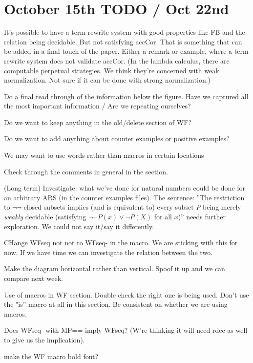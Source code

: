 \documentclass{article}
\newcommand{\cmark}{\ding{51}}%
\newcommand{\done}{\rlap{$\square$}{\raisebox{2pt}{\large\hspace{1pt}\cmark}}%
\hspace{-2.5pt}}
\begin{document}
\section*{October 15th TODO / Oct 22nd}
\begin{todolist}     
  \item It's possible to have a term rewrite system with good properties like FB and the relation being decidable. But not satisfying accCor. That is something that can be added in a final touch of the paper. Either a remark or example, where a term rewrite system does not validate accCor. (In the lambda calculus, there are computable perpetual strategies. We think they're concerned with weak normalization. Not sure if it can be done with strong normalization.)
  \item Do a final read through of the information below the figure. Have we captured all the most important information / Are we repeating ourselves?
  \item [\done] Do we want to keep anything in the old/delete section of WF?
  \item Do we want to add anything about counter examples or positive examples? 
  \item We may want to use words rather than macros in certain locations
  \item [\done] Check through the comments in general in the section. 
  \item (Long term) Investigate: what we've done for natural numbers could be done for an arbitrary ARS (in the counter examples files). The sentence: ''The restriction to $\lnot\lnot$-closed subsets implies (and is equivalent to) 
every subset $P$ being merely \emph{weakly} decidable (satisfying $\lnot \lnot P(x) \lor \lnot P(X)$ 
for all $x$)'' needs further exploration. We could not say it/say it differently. 
\item [\done]  CHange WFseq not not to WFseq- in the macro. We are sticking with this for now. If we have time we can investigate the relation between the two.
\item [\done]  Make the diagram horizontal rather than vertical. Spoof it up and we can compare next week.
\item [\done]  Use of macros in WF section. Double check the right one is being used. Don't use the "is'' macro at all in this section. Be consistent on whether we are using macros. 
\item Does WFseq- with MP== imply WFseq? (W're thinking it will need rdec as well to give us the implication).
\item make the WF macro bold font?

\end{todolist}
\end{document}

